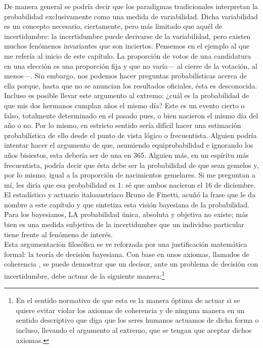 	De manera general se podría decir que los paradigmas tradicionales interpretan la probabilidad exclusivamente como una medida de variabilidad. Dicha variabilidad es un concepto necesario, ciertamente, pero más limitado que aquél de incertidumbre: la incertidumbre puede derivarse de la variabilidad, pero existen muchos fenómenos invariantes que son inciertos. Pensemos en el ejemplo al que me refería al inicio de este capítulo. La proporción de votos de una candidatura en una elección es una proporción fija y que no varía--- al cierre de la votación, al menos---. Sin embargo, nos podemos hacer preguntas probabilísticas acerca de ella porque, hasta que no se anuncian los resultados oficiales, ésta es desconocida. Incluso es posible llevar este argumento al extremo: ¿cuál es la probabilidad de que mis dos hermanos cumplan años el mismo día? Este es un evento cierto o falso, totalmente determinado en el pasado pues, o bien nacieron el mismo día del año o no. Por lo mismo, en estricto sentido sería difícil hacer una estimación probabilística de ello desde el punto de vista lógico o frecuentista. Alguien podría intentar hacer el argumento de que, asumiendo equiprobabilidad e ignorando los años bisiestos, esta debería ser de una en 365. Alguien más, en un espíritu más frecuentista, podría decir que ésta debe ser la probabilidad de que sean gemelos y, por lo mismo, igual a la proporción de nacimientos gemelares. Si me preguntan a mí, les diría que esa probabilidad es 1: sé que ambos nacieron el 16 de diciembre.\\	
	
	El estadístico y actuario italoaustríaco Bruno de Finetti, acuñó la frase que le da nombre a este capítulo y que sintetiza esta visión bayesiana de la probabilidad. Para los bayesianos, LA probabilidad única, absoluta y objetiva no existe; más bien es una medida subjetiva de la incertidumbre que un individuo particular tiene frente al fenómeno de interés.\\ 
	
	
	Esta argumentación filosófica se ve reforzada por una justificación matemática formal: la teoría de decisión bayesiana. Con base en unos axiomas, llamados de coherencia , se puede demostrar que un decisor, ante un problema de decisión con incertidumbre, debe actuar de la siguiente manera:\footnote{En el sentido normativo de que esta es la manera óptima de actuar si se quiere evitar violar los axiomas de coherencia y de ninguna manera en un sentido descriptivo que diga que los seres humanos actuamos de dicha forma o incluso, llevando el argumento al extremo, que se tengan que aceptar dichos axiomas.} 


